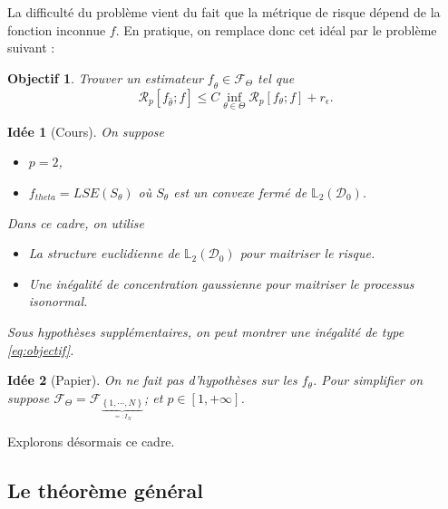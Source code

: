 \documentclass[11pt,letterpaper]{article}
\newtheorem*{objectif}{Objectif}
\newtheorem{idee}{Idée}
\begin{document}
\par La difficulté du problème vient du fait que la métrique de risque dépend de la fonction inconnue $f$. En pratique, on remplace donc cet idéal par le problème suivant :

\begin{objectif}
\par Trouver un estimateur $f_{\hat{\theta}} \in \mathcal{F}_\Theta$ tel que
	\begin{equation}
		\mathcal{R}_p \left[f_{\hat{\theta}}; f \right] \leq C \inf\limits_{\theta \in \Theta} \mathcal{R}_p \left[f_\theta; f \right] + r_\epsilon .
	\label{eq:objectif}
	\end{equation}

\end{objectif}

\begin{idee}[Cours]
\par On suppose
\begin{itemize}
\item $p = 2$,
\item $f_{theta} = LSE \left( S_\theta \right)$ où $S_\theta$ est un convexe fermé de $\mathbb{L}_2 \left( \mathcal{D}_0 \right)$.
\end{itemize}
\par Dans ce cadre, on utilise
\begin{itemize}
\item La structure euclidienne de $\mathbb{L}_2 \left( \mathcal{D}_0 \right)$ pour maitriser le risque.
\item Une inégalité de concentration gaussienne pour maitriser le processus isonormal.
\end{itemize}
\par Sous hypothèses supplémentaires, on peut montrer une inégalité de type \eqref{eq:objectif}.
\end{idee}

\begin{idee}[Papier]
\par On ne fait pas d'hypothèses sur les $f_\theta$. Pour simplifier on suppose $\mathcal{F}_\Theta = \mathcal{F}_{\underbrace{\left\lbrace 1, \cdots, N \right\rbrace}_{=: I_N}}$; et $p \in \left[ 1, + \infty \right]$.
\end{idee}

\par Explorons désormais ce cadre. 

\subsection{Le théorème général}
\end{document}
